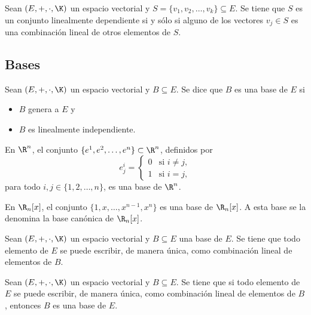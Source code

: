\documentclass[a4,11pt]{aleph-notas}
\begin{document}
\begin{teo}
    Sean $(E,+,\cdot,\K)$ un espacio vectorial y $S=\{v_1,v_2,\ldots,v_k\}\subseteq E$. Se tiene que $S$ es un conjunto linealmente dependiente si y sólo si alguno de los vectores $v_j\in S$ es una combinación lineal de otros elementos de $S$.
\end{teo}

\subsection{Bases}

\begin{defi}
    Sean $(E,+,\cdot,\K)$ un espacio vectorial y $B\subseteq E$. Se dice que $B$ es una base de $E$ si 
    \begin{itemize}
        \item $B$ genera a $E$ y 
        \item $B$ es linealmente independiente. 
    \end{itemize}
\end{defi}


\begin{teo}
    En $\R^n$, el conjunto $\{e^1,e^2,\ldots,e^n\}\subset\R^n$, definidos por 
    \[
        e^i_j=
        \begin{cases}
            0& \text{si }i\neq j,\\
            1& \text{si }i= j,
        \end{cases}
    \]
    para todo $i,j\in\{1,2,\ldots,n\}$, es una base de $\R^n$.
\end{teo}

\begin{teo}
    En $\R_n[x]$, el conjunto $\{1,x,\ldots,x^{n-1},x^n\}$ es una base de $\R_n[x]$. A esta base se la denomina la base canónica de $\R_n[x]$.
\end{teo}

\begin{teo}
    Sean $(E,+,\cdot,\K)$ un espacio vectorial y $B\subseteq E$ una base de $E$. Se tiene que todo elemento de $E$ se puede escribir, de manera única, como combinación lineal de elementos de $B$.
\end{teo}

\begin{teo}
    Sean $(E,+,\cdot,\K)$ un espacio vectorial y $B\subseteq E$. Se tiene que si todo elemento de $E$ se puede escribir, de manera única, como combinación lineal de elementos de $B$, entonces $B$ es una base de $E$.
\end{teo}
\end{document}
